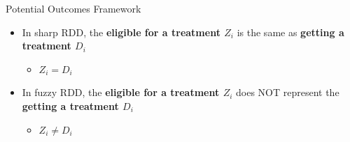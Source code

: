 \documentclass[dvipsnames,hyperref={pdfpagelabels=false}]{beamer}
\begin{document}
\begin{frame}{Potential Outcomes Framework}
	\begin{itemize}
		
		\item In sharp RDD, the \textbf{eligible for a treatment $Z_{i}$} is the same as \textbf{getting a treatment $D_{i}$} 
		\vspace{0.2cm}
		\begin{itemize}
			\item $Z_{i}=D_{i}$
		\end{itemize}
		
		\vspace{0.2cm}
		\item In fuzzy RDD, the \textbf{eligible for a treatment $Z_{i}$} does NOT represent the \textbf{getting a treatment $D_{i}$} 
		
		\vspace{0.2cm}
		\begin{itemize}
			\item $Z_{i}\neq D_{i}$
		\end{itemize}
		
		
		
		
		
	\end{itemize}
\end{frame}



%		
\end{document}
